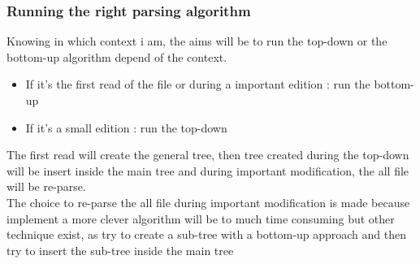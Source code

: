 \subsubsection{Running the right parsing algorithm}
Knowing in which context i am, the aims will be to run the top-down or the bottom-up algorithm depend of the context.
\begin{itemize}
\item If it's the first read of the file or during a important edition : run the bottom-up
\item If it's a small edition : run the top-down
\end{itemize}

The first read will create the general tree, then tree created during the top-down will be insert inside the main tree and during important modification, the all file will be re-parse.\\
The choice to re-parse the all file during important modification is made because implement a more clever algorithm will be to much time consuming but other technique exist, as try to create a sub-tree with a bottom-up approach and then try to insert the sub-tree inside the main tree

